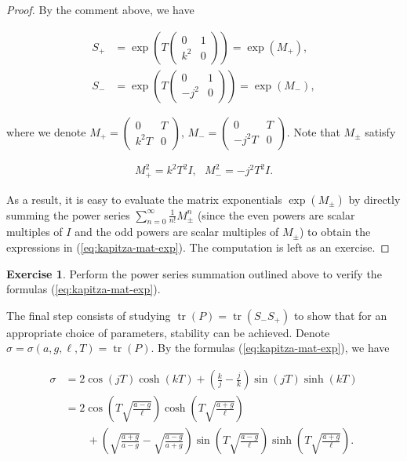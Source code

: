 \documentclass[11pt]{report}
\theoremstyle{plain}
\theoremstyle{definition}
\newtheorem{xexercise}[thm]{Exercise}
\begin{document}
\begin{proof}
By the comment above, we have

\begin{align*}
S_+ &= \exp\left(T \left(\begin{array}{cc} 0 & 1 \\ k^2 & 0
\end{array} \right) \right) = \exp(M_+), \\
S_- &= \exp\left(T \left(\begin{array}{cc} 0 & 1 \\ -j^2 & 0
\end{array} \right) \right) = \exp(M_-),
\end{align*}

where we denote
$M_+ = \left(\begin{array}{cc} 0 & T \\ k^2T & 0
\end{array}\right)$,
$M_- = \left(\begin{array}{cc} 0 & T \\ -j^2 T & 0
\end{array}\right)$.
Note that $M_\pm$ satisfy

\begin{align*}
M_+^2 = k^2 T^2 I, \ \ \
M_-^2 = -j^2 T^2 I.
\end{align*}

As a result, it is easy to evaluate the matrix
exponentials $\exp(M_\pm)$ by directly summing the
power series $\sum_{n=0}^\infty \frac{1}{n!}M_{\pm}^n$
(since the even powers are scalar multiples of $I$
and the odd powers are scalar multiples of $M_\pm$)
to obtain the expressions in (\ref{eq:kapitza-mat-exp}).
The computation is left as an exercise.
\end{proof}

\begin{xexercise}
Perform the power series summation outlined above to
verify the formulas (\ref{eq:kapitza-mat-exp}).
\end{xexercise}

The final step consists of studying
$\operatorname{tr}(P)=\operatorname{tr}(S_- S_+)$ to
show that for an appropriate choice of parameters,
stability can be achieved. Denote
$\sigma = \sigma(a, g, \ell, T) =
\operatorname{tr}(P)$.
By the formulas (\ref{eq:kapitza-mat-exp}), we have

\begin{align*}
\sigma &=
2\cos\left(jT\right)\cosh\left(kT\right)
+ \left(\frac{k}{j}-\frac{j}{k}\right)
\sin\left(jT\right)\sinh\left(kT\right) \\
&=
2\cos\left(T\sqrt{\frac{a-g}{\ell}}\right)
\cosh\left(T\sqrt{\frac{a+g}{\ell}}\right) \\
& \qquad +
\left(\sqrt{\frac{a+g}{a-g}}-\sqrt{\frac{a-g}{a+g}}
\right)
\sin\left(T\sqrt{\frac{a-g}{\ell}}\right)
\sinh\left(T\sqrt{\frac{a+g}{\ell}}\right).
\end{align*}
\end{document}

